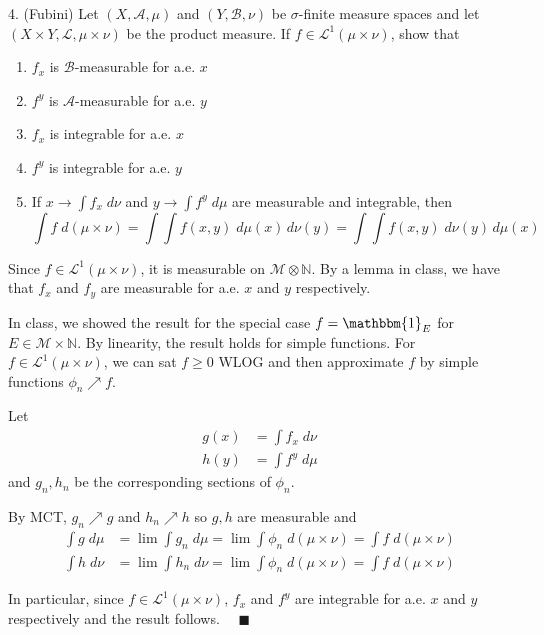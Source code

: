 \documentclass[12pt]{article}
\newcommand{\N}{\mathbb{N}}
\newcommand{\ind}{\mathbbm{1}}
\newcommand{\qed}{\quad \blacksquare}
\newcommand{\A}{\mathcal{A}}
\newcommand{\B}{\mathcal{B}}
\newcommand{\M}{\mathcal{M}}
\renewcommand{\L}{\mathcal{L}}
\begin{document}
4. (Fubini) Let $(X, \A, \mu)$ and $(Y, \B, \nu)$ be $\sigma$-finite measure spaces and let $(X \times Y, \L, \mu \times \nu)$ be the product measure. If $f \in \L^1(\mu \times \nu)$, show that 
\begin{enumerate}
    \item $f_x$ is $\B$-measurable for a.e. $x$ 
    \item $f^y$ is $\A$-measurable for a.e. $y$
    \item $f_x$ is integrable for a.e. $x$
    \item $f^y$ is integrable for a.e. $y$
    \item If $x \to \int f_x \; d\nu$ and $y \to \int f^y \; d\mu$ are measurable and integrable, then
    \[\int f \;d(\mu \times \nu) = \int \int f(x, y) \; d\mu(x)\,d\nu(y) = \int \int f(x, y) \; d\nu(y)\,d\mu(x)\]
\end{enumerate}

    \color{blue}
        Since $f \in \L^1(\mu \times \nu)$, it is measurable on $\M \otimes \N$. By a lemma in class, we have that $f_x$ and $f_y$ are measurable for a.e. $x$ and $y$ respectively.

        In class, we showed the result for the special case $f = \ind_E$ for $E \in \M \times \N$. By linearity, the result holds for simple functions. For $f \in \L^1(\mu \times \nu)$, we can sat $f \geq 0$ WLOG and then approximate $f$ by simple functions $\phi_n \nearrow f$. 

        Let 
        \begin{align*}
            g(x) &= \int f_x\; d\nu\\ 
            h(y) &= \int f^y\; d\mu
        \end{align*}
        and $g_n, h_n$ be the corresponding sections of $\phi_n$.

        By MCT, $g_n \nearrow g$ and $h_n \nearrow h$ so $g, h$ are measurable and 
        \begin{align*}
            \int g \; d\mu &= \lim \int g_n \; d\mu = \lim \int \phi_n \; d(\mu \times \nu) = \int f \; d(\mu \times \nu)\\
            \int h \; d\nu &= \lim \int h_n \; d\nu = \lim \int \phi_n \; d(\mu \times \nu) = \int f \; d(\mu \times \nu)
        \end{align*}

        In particular, since $f \in \L^1(\mu \times \nu)$, $f_x$ and $f^y$ are integrable for a.e. $x$ and $y$ respectively and the result follows. $\qed$
\end{document}
